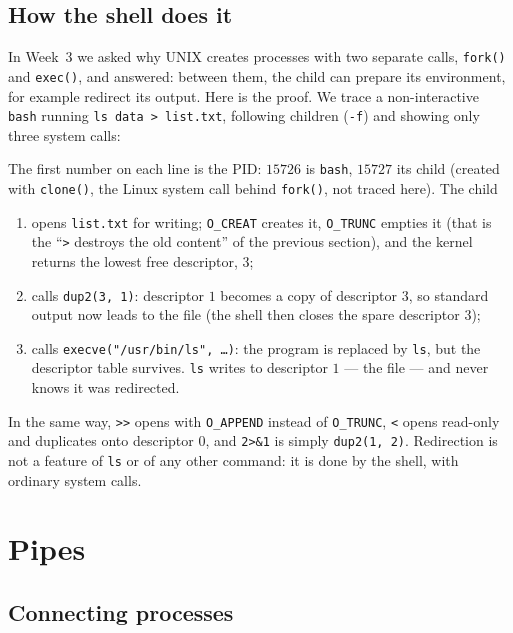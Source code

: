 \documentclass[11pt,a4paper]{article}
\newcommand{\cmd}[1]{\texttt{#1}}
\begin{document}
\subsection{How the shell does it}
\label{sec:dup2}

In Week~3 we asked why UNIX creates processes with two separate calls, \cmd{fork()} and \cmd{exec()}, and answered: between them, the child can prepare its environment, for example redirect its output. Here is the proof. We trace a non-interactive \cmd{bash} running \cmd{ls data > list.txt}, following children (\cmd{-f}) and showing only three system calls:



The first number on each line is the PID: $15726$ is \cmd{bash}, $15727$ its child (created with \cmd{clone()}, the Linux system call behind \cmd{fork()}, not traced here). The child
\begin{enumerate}[leftmargin=1.4em]
  \item opens \texttt{list.txt} for writing; \texttt{O\_CREAT} creates it, \texttt{O\_TRUNC} empties it (that is the ``\cmd{>} destroys the old content'' of the previous section), and the kernel returns the lowest free descriptor, $3$;
  \item calls \cmd{dup2(3, 1)}: descriptor $1$ becomes a copy of descriptor $3$, so standard output now leads to the file (the shell then closes the spare descriptor $3$);
  \item calls \cmd{execve("/usr/bin/ls", \dots)}: the program is replaced by \cmd{ls}, but the descriptor table survives. \cmd{ls} writes to descriptor $1$ --- the file --- and never knows it was redirected.
\end{enumerate}
In the same way, \cmd{>>} opens with \texttt{O\_APPEND} instead of \texttt{O\_TRUNC}, \cmd{<} opens read-only and duplicates onto descriptor $0$, and \cmd{2>\&1} is simply \cmd{dup2(1, 2)}. Redirection is not a feature of \cmd{ls} or of any other command: it is done by the shell, with ordinary system calls.

\section{Pipes}
\label{sec:pipes}

\subsection{Connecting processes}
\end{document}
